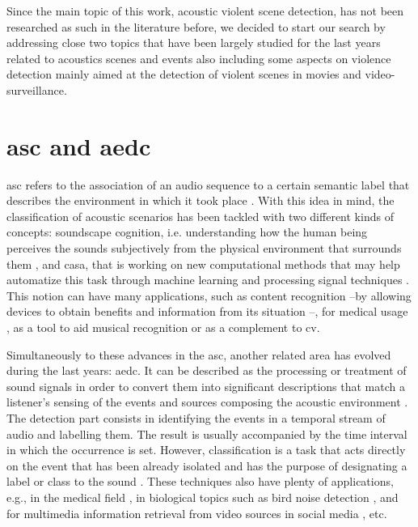 
	Since the main topic of this work, acoustic violent scene detection, has not been researched as such in the literature before, we decided to start our search by addressing close two topics that have been largely studied for the last years related to acoustics scenes and events also including some aspects on violence detection mainly aimed at the detection of violent scenes in movies and video-surveillance.
	
\section{\acrlong{asc} and \acrlong{aedc}}

	 \acrfull{asc} refers to the association of an audio sequence to a certain semantic label that describes the environment in which it took place \cite{Barchiesi2015}. With this idea in mind, the classification of acoustic scenarios has been tackled with two different kinds of concepts: soundscape cognition, i.e. understanding how the human being perceives the sounds subjectively from the physical environment that surrounds them  \cite{Dubois2006}, and  \acrfull{casa}, that is working on new computational methods that may help automatize this task through machine learning and processing signal techniques \cite{Wang2006}. This notion can have many applications, such as content recognition --by allowing devices to obtain benefits and information from its situation \cite{Eronen2006}--, for medical usage \cite{Bahoura2009}, as a tool to aid  musical recognition \cite{Van2013} or as a complement to \acrfull{cv}.
	
	Simultaneously to these advances in the \acrshort{asc}, another related area has evolved during the last years: %
	\acrfull{aedc}. It can be described as the processing or treatment of sound signals in order to convert them into significant descriptions that match a listener's sensing of the events and sources composing the acoustic environment \cite{Temko2009}. The detection part consists in identifying the events in a temporal stream of audio and labelling them. The result is usually accompanied by the time interval in which the occurrence is set. However, classification is a task that acts directly on the event that has been already isolated and has the purpose of designating a label or class to the sound \cite{Temko2007}. These techniques also have plenty of applications, e.g., in the medical field \cite{Bahoura2010}, in biological topics such as bird noise detection \cite{Potamitis2014}, and for multimedia information retrieval from video sources in social media \cite{Wang2016}, etc.

